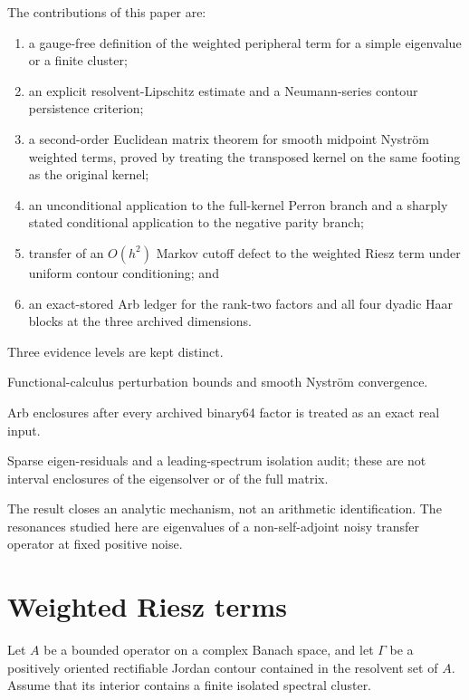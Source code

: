 \documentclass[11pt]{article}
\theoremstyle{definition}
\theoremstyle{remark}
\begin{document}
The contributions of this paper are:
\begin{enumerate}[leftmargin=2em]
 \item a gauge-free definition of the weighted peripheral term for a simple
       eigenvalue or a finite cluster;
 \item an explicit resolvent-Lipschitz estimate and a Neumann-series contour
       persistence criterion;
 \item a second-order Euclidean matrix theorem for smooth midpoint
       Nystr\"om weighted terms, proved by treating the transposed kernel on
       the same footing as the original kernel;
 \item an unconditional application to the full-kernel Perron branch and a
       sharply stated conditional application to the negative parity branch;
 \item transfer of an $O(h^2)$ Markov cutoff defect to the weighted Riesz
       term under uniform contour conditioning; and
 \item an exact-stored Arb ledger for the rank-two factors and all four
       dyadic Haar blocks at the three archived dimensions.
\end{enumerate}

Three evidence levels are kept distinct.
\begin{description}[leftmargin=3.0cm,style=nextline]
 \item[Analytic theorem]
 Functional-calculus perturbation bounds and smooth Nystr\"om convergence.
 \item[Exact-stored ledger]
 Arb enclosures after every archived binary64 factor is treated as an exact
 real input.
 \item[Floating diagnostic]
 Sparse eigen-residuals and a leading-spectrum isolation audit; these are not
 interval enclosures of the eigensolver or of the full matrix.
\end{description}

The result closes an analytic mechanism, not an arithmetic identification.
The resonances studied here are eigenvalues of a non-self-adjoint noisy
transfer operator at fixed positive noise.

\section{Weighted Riesz terms}
\label{sec:riesz}

Let $A$ be a bounded operator on a complex Banach space, and let $\Gamma$ be
a positively oriented rectifiable Jordan contour contained in the resolvent
set of $A$.  Assume that its interior contains a finite isolated spectral
cluster.
\end{document}
